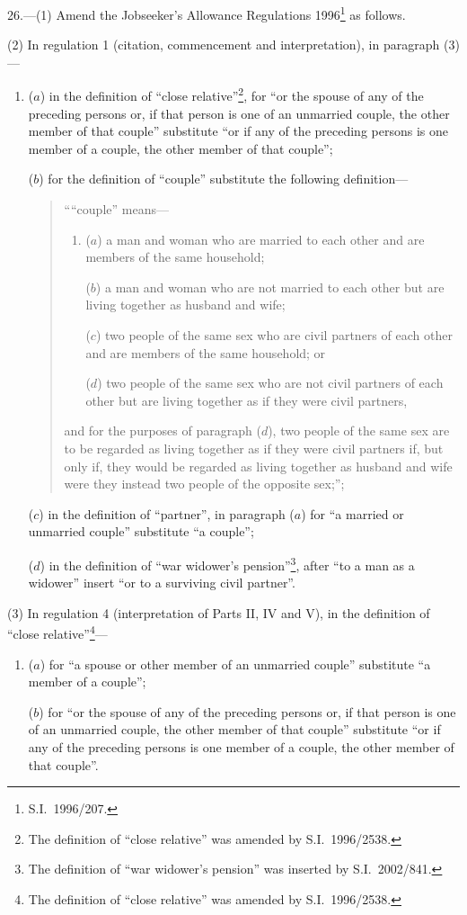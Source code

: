 \documentclass[12pt,a4paper]{article}
\begin{document}
26.---(1)  Amend the Jobseeker’s Allowance Regulations 1996\footnote{S.I.\ 1996/207.} as follows.

(2) In regulation 1 (citation, commencement and interpretation), in paragraph (3)—
\begin{enumerate}\item[]
($a$) in the definition of “close relative”\footnote{The definition of “close relative” was amended by S.I.\ 1996/2538.}, for “or the spouse of any of the preceding persons or, if that person is one of an unmarried couple, the other member of that couple” substitute “or if any of the preceding persons is one member of a couple, the other member of that couple”;

($b$) for the definition of “couple” substitute the following definition—
\begin{quotation}
““couple” means—
\begin{enumerate}\item[]
($a$) 
a man and woman who are married to each other and are members of the same household;

($b$) 
a man and woman who are not married to each other but are living together as husband and wife;

($c$) 
two people of the same sex who are civil partners of each other and are members of the same household; or

($d$) 
two people of the same sex who are not civil partners of each other but are living together as if they were civil partners,
\end{enumerate}
and for the purposes of paragraph ($d$), two people of the same sex are to be regarded as living together as if they were civil partners if, but only if, they would be regarded as living together as husband and wife were they instead two people of the opposite sex;”;
\end{quotation}

($c$) in the definition of “partner”, in paragraph ($a$)  for “a married or unmarried couple” substitute “a couple”;

($d$) in the definition of “war widower’s pension”\footnote{The definition of “war widower’s pension” was inserted by S.I.\ 2002/841.}, after “to a man as a widower” insert “or to a surviving civil partner”.
\end{enumerate}

(3) In regulation 4 (interpretation of Parts II, IV and V), in the definition of “close relative”\footnote{The definition of “close relative” was amended by S.I.\ 1996/2538.}—
\begin{enumerate}\item[]
($a$) for “a spouse or other member of an unmarried couple” substitute “a member of a couple”;

($b$) for “or the spouse of any of the preceding persons or, if that person is one of an unmarried couple, the other member of that couple” substitute “or if any of the preceding persons is one member of a couple, the other member of that couple”.
\end{enumerate}
\end{document}
